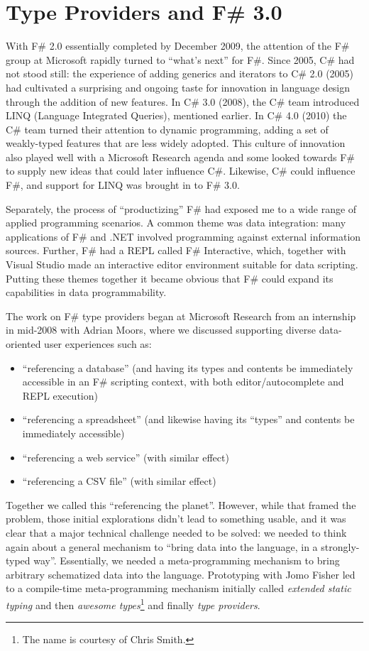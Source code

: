 \documentclass[acmsmall,review]{acmart}\settopmatter{printfolios=true,printccs=false,printacmref=false}
\begin{document}
\section*{Type Providers and F\# 3.0 }

With F\# 2.0 essentially completed by December 2009, the attention of the F\# group at Microsoft rapidly turned to “what’s next”
for F\#. Since 2005, C\# had not stood still: the experience of adding generics and iterators to C\# 2.0 (2005) had cultivated a
surprising and ongoing taste for innovation in language design through the addition of new features.  In C\# 3.0 (2008), the
C\# team introduced LINQ (Language Integrated Queries), mentioned earlier. In C\# 4.0 (2010) the C\# team turned their
attention to dynamic programming, adding a set of weakly-typed features that are less widely adopted. This culture of innovation
also played well with a Microsoft Research agenda and some looked towards F\# to supply new ideas that could later influence
C\#.  Likewise, C\# could influence F\#, and support for LINQ was brought in to F\# 3.0.

Separately, the process of “productizing” F\# had exposed me to a wide range of applied programming scenarios.  A common theme
was data integration: many applications of F\# and .NET involved programming against external information sources.  Further, F\# had
a REPL called F\# Interactive, which, together with Visual Studio made an interactive editor environment suitable for data scripting.
Putting these themes together it became obvious that F\# could expand its capabilities in data programmability.

The work on F\# type providers began at Microsoft Research from an internship in mid-2008 with Adrian Moors, where we discussed
supporting diverse data-oriented user experiences such as:

\begin{itemize}
\item “referencing a database” (and having its types and contents be immediately accessible in an F\# scripting context, with both editor/autocomplete and REPL execution)
\item “referencing a spreadsheet” (and likewise having its “types” and contents be immediately accessible)
\item “referencing a web service” (with similar effect)
\item “referencing a CSV file” (with similar effect)
\end{itemize}

Together we called this “referencing the planet”.  However, while that framed the problem, those initial explorations didn’t lead
to something usable, and it was clear that a major technical challenge needed to be solved: we needed to think again about a
general mechanism to “bring data into the language, in a strongly-typed way”.  Essentially, we needed a meta-programming
mechanism to bring arbitrary schematized data into the language. Prototyping with Jomo Fisher led to a compile-time meta-programming
mechanism initially called \textit{extended static typing} and then \textit{awesome types}\footnote{The name is courtesy of Chris Smith.} and finally \textit{type providers}. 
\end{document}
